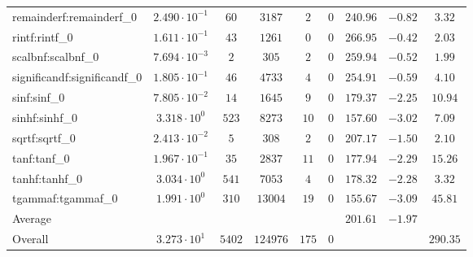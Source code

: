 \begin{tabular}{|l|c|c|c|c|c|c|c|c|}
remainderf:remainderf\_0     & $ 2.490 \cdot 10^{-1} $ & $ 60     $ & $ 3187   $ & $ 2   $ & $ 0   $ & $ 240.96      $ & $ -0.82   $ & $ 3.32    $ \\
rintf:rintf\_0               & $ 1.611 \cdot 10^{-1} $ & $ 43     $ & $ 1261   $ & $ 0   $ & $ 0   $ & $ 266.95      $ & $ -0.42   $ & $ 2.03    $ \\
scalbnf:scalbnf\_0           & $ 7.694 \cdot 10^{-3} $ & $ 2      $ & $ 305    $ & $ 2   $ & $ 0   $ & $ 259.94      $ & $ -0.52   $ & $ 1.99    $ \\
significandf:significandf\_0 & $ 1.805 \cdot 10^{-1} $ & $ 46     $ & $ 4733   $ & $ 4   $ & $ 0   $ & $ 254.91      $ & $ -0.59   $ & $ 4.10    $ \\
sinf:sinf\_0                 & $ 7.805 \cdot 10^{-2} $ & $ 14     $ & $ 1645   $ & $ 9   $ & $ 0   $ & $ 179.37      $ & $ -2.25   $ & $ 10.94   $ \\
sinhf:sinhf\_0               & $ 3.318 \cdot 10^{0}  $ & $ 523    $ & $ 8273   $ & $ 10  $ & $ 0   $ & $ 157.60      $ & $ -3.02   $ & $ 7.09    $ \\
sqrtf:sqrtf\_0               & $ 2.413 \cdot 10^{-2} $ & $ 5      $ & $ 308    $ & $ 2   $ & $ 0   $ & $ 207.17      $ & $ -1.50   $ & $ 2.10    $ \\
tanf:tanf\_0                 & $ 1.967 \cdot 10^{-1} $ & $ 35     $ & $ 2837   $ & $ 11  $ & $ 0   $ & $ 177.94      $ & $ -2.29   $ & $ 15.26   $ \\
tanhf:tanhf\_0               & $ 3.034 \cdot 10^{0}  $ & $ 541    $ & $ 7053   $ & $ 4   $ & $ 0   $ & $ 178.32      $ & $ -2.28   $ & $ 3.32    $ \\
tgammaf:tgammaf\_0           & $ 1.991 \cdot 10^{0}  $ & $ 310    $ & $ 13004  $ & $ 19  $ & $ 0   $ & $ 155.67      $ & $ -3.09   $ & $ 45.81   $ \\
\hline
Average                      & $                     $ & $        $ & $        $ & $     $ & $     $ & $ 201.61      $ & $ -1.97   $ & $         $ \\
\hline
Overall                      & $ 3.273 \cdot 10^{1}  $ & $ 5402   $ & $ 124976 $ & $ 175 $ & $ 0   $ & $             $ & $         $ & $ 290.35  $ \\
\hline
\end{tabular}
